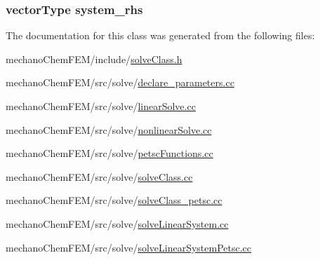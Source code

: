 \subsubsection[{system\-\_\-rhs}]{\setlength{\rightskip}{0pt plus 5cm}vector\-Type system\-\_\-rhs}\label{classsolve_class_a6c39fa839fdc40d2408946617a778571}


The documentation for this class was generated from the following files\-:\begin{DoxyCompactItemize}
\item 
mechano\-Chem\-F\-E\-M/include/\hyperlink{solve_class_8h}{solve\-Class.\-h}\item 
mechano\-Chem\-F\-E\-M/src/solve/\hyperlink{solve_2declare__parameters_8cc}{declare\-\_\-parameters.\-cc}\item 
mechano\-Chem\-F\-E\-M/src/solve/\hyperlink{linear_solve_8cc}{linear\-Solve.\-cc}\item 
mechano\-Chem\-F\-E\-M/src/solve/\hyperlink{nonlinear_solve_8cc}{nonlinear\-Solve.\-cc}\item 
mechano\-Chem\-F\-E\-M/src/solve/\hyperlink{petsc_functions_8cc}{petsc\-Functions.\-cc}\item 
mechano\-Chem\-F\-E\-M/src/solve/\hyperlink{solve_class_8cc}{solve\-Class.\-cc}\item 
mechano\-Chem\-F\-E\-M/src/solve/\hyperlink{solve_class__petsc_8cc}{solve\-Class\-\_\-petsc.\-cc}\item 
mechano\-Chem\-F\-E\-M/src/solve/\hyperlink{solve_linear_system_8cc}{solve\-Linear\-System.\-cc}\item 
mechano\-Chem\-F\-E\-M/src/solve/\hyperlink{solve_linear_system_petsc_8cc}{solve\-Linear\-System\-Petsc.\-cc}\end{DoxyCompactItemize}
